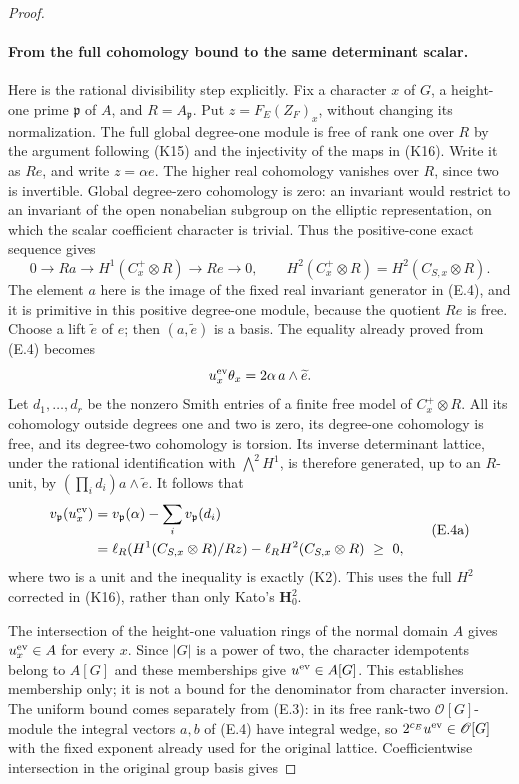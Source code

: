 \begin{proof}
\paragraph{From the full cohomology bound to the same determinant scalar.}
Here is the rational divisibility step explicitly. Fix a character
$x$ of $G$, a height-one prime $\mathfrak p$ of $A$, and
$R=A_{\mathfrak p}$. Put $z=F_E(Z_F)_x$, without changing its
normalization. The full global degree-one module is free of rank one
over $R$ by the argument following (K15) and the injectivity of the
maps in (K16). Write it as $Re$, and write $z=\alpha e$.
The higher real cohomology vanishes over $R$, since two is invertible.
Global degree-zero cohomology is zero: an invariant would restrict
to an invariant of the open nonabelian subgroup on the elliptic
representation, on which the scalar coefficient character is trivial.
Thus the positive-cone exact sequence gives
\[
 0\longrightarrow R a\longrightarrow
 H^1(C^+_x\otimes R)\longrightarrow Re\longrightarrow0,
 \qquad
 H^2(C^+_x\otimes R)=H^2(C_{S,x}\otimes R).
\]
The element $a$ here is the image of the fixed real invariant generator
in (E.4), and it is primitive in this positive degree-one module,
because the quotient $Re$ is free. Choose a lift $\widetilde e$ of $e$;
then $(a,\widetilde e)$ is a basis. The equality already proved from
(E.4) becomes
\[
                 u_x^{\rm ev}\theta_x
                  =2\alpha\,a\wedge\widetilde e.
\]
Let $d_1,\ldots,d_r$ be the nonzero Smith entries of a finite free
model of $C^+_x\otimes R$. All its cohomology outside degrees one and
two is zero, its degree-one cohomology is free, and its degree-two
cohomology is torsion. Its inverse determinant lattice, under the
rational identification with $\bigwedge^2H^1$, is therefore generated,
up to an $R$-unit, by
$(\prod_i d_i)a\wedge\widetilde e$. It follows that
\[
 \begin{split}
 v_{\mathfrak p}(u_x^{\rm ev})
 &=v_{\mathfrak p}(\alpha)-\sum_i v_{\mathfrak p}(d_i)\\
 &=\ell_R(H^1(C_{S,x}\otimes R)/Rz)
       -\ell_R H^2(C_{S,x}\otimes R)\ \geq\ 0,
 \end{split}                                                   \tag{E.4a}
\]
where two is a unit and the inequality is exactly (K2).
This uses the full $H^2$ corrected in (K16), rather than only Kato's
$\mathbf H^2_0$.

The intersection of the height-one valuation rings of the normal
domain $A$ gives $u_x^{\rm ev}\in A$ for every $x$. Since $|G|$ is
a power of two, the character idempotents belong to $A[G]$ and these
memberships give $u^{\rm ev}\in A[G]$. This establishes membership
only; it is not a bound for the denominator from character inversion.
The uniform bound comes separately from (E.3): in its free rank-two
$\mathscr O[G]$-module the integral vectors $a,b$ of (E.4) have integral
wedge, so $2^{c_E}u^{\rm ev}\in\mathscr O[G]$ with the fixed exponent
already used for the original lattice. Coefficientwise intersection
in the original group basis gives



\end{proof}
